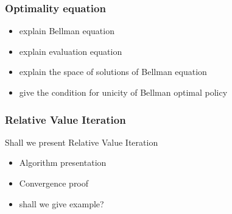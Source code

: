 \subsubsection{Optimality equation}

\begin{itemize}
    \item explain Bellman equation
    \item explain evaluation equation
    \item explain the space of solutions of Bellman equation
    \item give the condition for unicity of Bellman optimal policy
\end{itemize}

\subsubsection{Relative Value Iteration}

Shall we present Relative Value Iteration

\begin{itemize}
    \item Algorithm presentation
    \item Convergence proof
    \item shall we give example?
\end{itemize}
